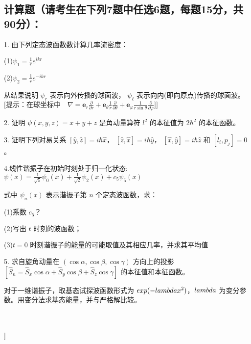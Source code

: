 \subsection{计算题（请考生在下列7题中任选6题，每题15分，共90分）：}

1. 由下列定态波函数数计算几率流密度：

(1)$\psi_1 = \frac{1}{r} e^{ikr}$ 


(2)$\psi_2 = \frac{1}{r} e^{-ikr}$

从结果说明 $\psi_r$ 表示向外传播的球面波， $\psi_\ell$ 表示向内(即向原点)传播的球面波。
$\text{[提示：在球坐标中}\quad \nabla = \mathbf{e}_r \frac{\partial}{\partial r} + \mathbf{e}_\theta \frac{1}{r} \frac{\partial}{\partial \theta} + \mathbf{e}_\varphi \frac{1}{r \sin \theta} \frac{\partial}{\partial \varphi}\text{]}]$

2. 证明 $\psi (x,y,z) = x + y + z$ 是角动量算符 $l^2$ 的本征值为 $2\hbar^2$ 的本征函数。

3. 证明下列对易关系 $[ \hat{y}, \hat{z} ] = i\hbar \hat{x}$， $[\hat{z}, \hat{x}] = i\hbar \hat{y}$， $[\hat{x}, \hat{y}] = i\hbar \hat{z}$ 和 $[l_i, p_j] = 0$。

4.线性谐振子在初始时刻处于归一化状态:
$\psi(x) = \frac{1}{\sqrt{5}} \psi_0(x) + \frac{1}{\sqrt{2}} \psi_2(x) + c_5 \psi_5(x)$

式中 $\psi_n(x)$ 表示谐振子第 $n$ 个定态波函数，求：

(1)系数 $c_5$？

(2)写出 $t$ 时刻的波函数；

(3)$t=0$ 时刻谐振子的能量的可能取值及其相应几率，并求其平均值

5. 求自旋角动量在 $(\cos \alpha, \cos \beta, \cos \gamma)$ 方向上的投影
$[\hat{S}_n = \hat{S}_x \cos \alpha + \hat{S}_y \cos \beta + \hat{S}_z \cos \gamma]$
的本征值和本征函数。

对于一维谐振子，取基态试探波函数形式为 $\\exp(-\\lambda x^2)$，$\\lambda$ 为变分参数。用变分法求基态能量，并与严格解比较。

\\[ \\left[ \\text{提示：} \\int_{0}^{\\infty} x^{2n} e^{-ax^2} dx = \\frac{1 \\cdot 3 \\cdot 5 \\cdot \\ldots \\cdot (2n-1)}{2^{n+1} a^n} \\sqrt{\\frac{\\pi}{a}} \\right] \\]

\
